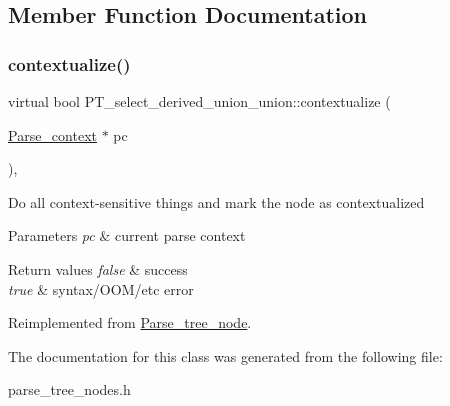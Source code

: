 \subsection{Member Function Documentation}
\mbox{\label{classPT__select__derived__union__union_a543c2b2f601f6de6e164547d6ba0c8e8}} 
\subsubsection{\texorpdfstring{contextualize()}{contextualize()}}
{\footnotesize\ttfamily virtual bool P\+T\+\_\+select\+\_\+derived\+\_\+union\+\_\+union\+::contextualize (\begin{DoxyParamCaption}\item[{\mbox{\hyperlink{structParse__context}{Parse\+\_\+context}} $\ast$}]{pc }\end{DoxyParamCaption})\hspace{0.3cm}{\ttfamily [inline]}, {\ttfamily [virtual]}}

Do all context-\/sensitive things and mark the node as contextualized


\begin{DoxyParams}{Parameters}
{\em pc} & current parse context\\
\hline
\end{DoxyParams}

\begin{DoxyRetVals}{Return values}
{\em false} & success \\
\hline
{\em true} & syntax/\+O\+O\+M/etc error \\
\hline
\end{DoxyRetVals}


Reimplemented from \mbox{\hyperlink{classParse__tree__node_a22d93524a537d0df652d7efa144f23da}{Parse\+\_\+tree\+\_\+node}}.



The documentation for this class was generated from the following file\+:\begin{DoxyCompactItemize}
\item 
parse\+\_\+tree\+\_\+nodes.\+h\end{DoxyCompactItemize}
